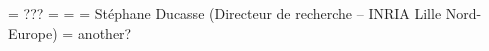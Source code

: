 \documentclass[a4paper,12pt,twoside]{../includes/ThesisStyle}
\begin{document}
\fi

\ThesisDate{}
\ThesisLilleI
\President = {???} 
\Rapporteurs = {
} 
\Examinateurs = {
} 
\Directeur = {
St\'ephane Ducasse  \quad   \xspace(Directeur de recherche -- INRIA Lille Nord-Europe)}
\Coencadreur = {
another?
}
\MakeThesisTitlePage 

\ifx\wholebook\relax\else
    
\end{document}
